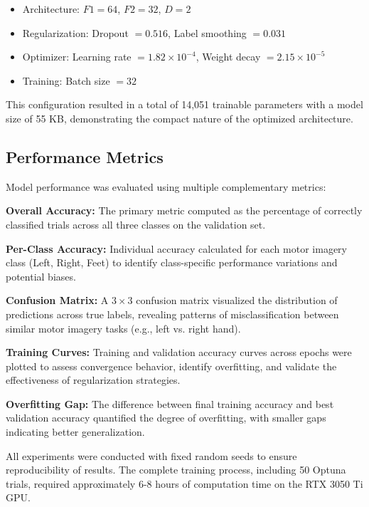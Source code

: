 \begin{itemize}
    \item Architecture: $F1=64$, $F2=32$, $D=2$
    \item Regularization: Dropout $= 0.516$, Label smoothing $= 0.031$
    \item Optimizer: Learning rate $= 1.82 \times 10^{-4}$, Weight decay $= 2.15 \times 10^{-5}$
    \item Training: Batch size $= 32$
\end{itemize}

This configuration resulted in a total of 14,051 trainable parameters with a model size of 55 KB, demonstrating the compact nature of the optimized architecture.

\subsection{Performance Metrics}

Model performance was evaluated using multiple complementary metrics:

\textbf{Overall Accuracy:} The primary metric computed as the percentage of correctly classified trials across all three classes on the validation set.

\textbf{Per-Class Accuracy:} Individual accuracy calculated for each motor imagery class (Left, Right, Feet) to identify class-specific performance variations and potential biases.

\textbf{Confusion Matrix:} A $3 \times 3$ confusion matrix visualized the distribution of predictions across true labels, revealing patterns of misclassification between similar motor imagery tasks (e.g., left vs. right hand).

\textbf{Training Curves:} Training and validation accuracy curves across epochs were plotted to assess convergence behavior, identify overfitting, and validate the effectiveness of regularization strategies.

\textbf{Overfitting Gap:} The difference between final training accuracy and best validation accuracy quantified the degree of overfitting, with smaller gaps indicating better generalization.

All experiments were conducted with fixed random seeds to ensure reproducibility of results. The complete training process, including 50 Optuna trials, required approximately 6-8 hours of computation time on the RTX 3050 Ti GPU.
